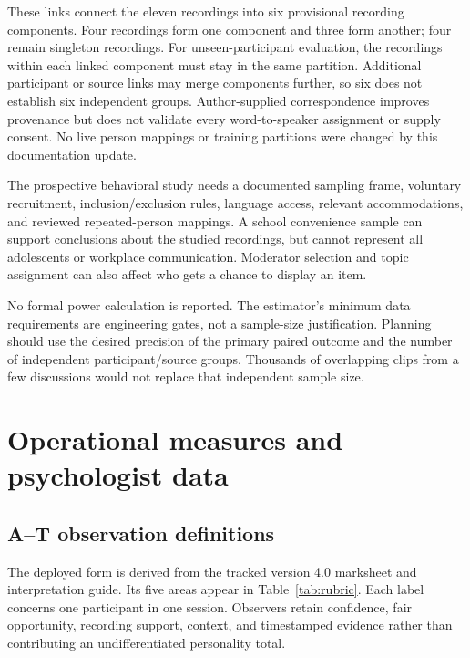\documentclass{article}
\begin{document}
These links connect the eleven recordings into six provisional recording components. Four recordings form one component and three form another; four remain singleton recordings. For unseen-participant evaluation, the recordings within each linked component must stay in the same partition. Additional participant or source links may merge components further, so six does not establish six independent groups. Author-supplied correspondence improves provenance but does not validate every word-to-speaker assignment or supply consent. No live person mappings or training partitions were changed by this documentation update.

The prospective behavioral study needs a documented sampling frame, voluntary recruitment, inclusion/exclusion rules, language access, relevant accommodations, and reviewed repeated-person mappings. A school convenience sample can support conclusions about the studied recordings, but cannot represent all adolescents or workplace communication. Moderator selection and topic assignment can also affect who gets a chance to display an item.

No formal power calculation is reported. The estimator's minimum data requirements are engineering gates, not a sample-size justification. Planning should use the desired precision of the primary paired outcome and the number of independent participant/source groups. Thousands of overlapping clips from a few discussions would not replace that independent sample size.

\section{Operational measures and psychologist data}
\subsection{A--T observation definitions}
The deployed form is derived from the tracked version 4.0 marksheet and interpretation guide. Its five areas appear in Table~\ref{tab:rubric}. Each label concerns one participant in one session. Observers retain confidence, fair opportunity, recording support, context, and timestamped evidence rather than contributing an undifferentiated personality total.
\end{document}
